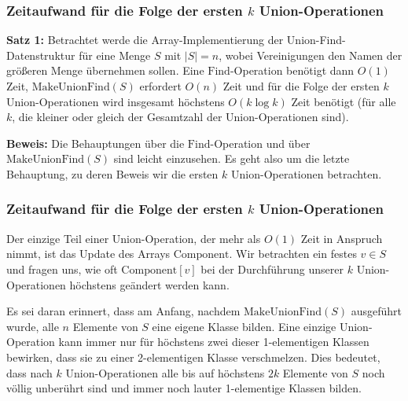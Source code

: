 \documentclass[smaller,xcolor=dvipsnames]{beamer}
\newcommand{\opfind}{\text{Find}}
\newcommand{\opunion}{\text{Union}}
\newcommand{\opmakeunionfind}{\text{MakeUnionFind}}
\newcommand{\component}{\text{Component}}
\begin{document}
\begin{frame}
\frametitle{Zeitaufwand für die Folge der ersten $k$ Union-Operationen}
\textbf{Satz 1:}
Betrachtet werde die \alert{Array-Implementierung der Union-Find-Datenstruktur} für eine Menge $S$ mit $|S|=n$, wobei Vereinigungen den Namen der größeren Menge übernehmen sollen. Eine $\opfind$-Operation benötigt dann $O(1)$ Zeit, $\opmakeunionfind{(S)}$ erfordert $O(n)$ Zeit und für die Folge der ersten $k$ $\opunion$-Operationen wird insgesamt höchstens $O(k \log{k})$ Zeit benötigt (für alle $k$, die kleiner oder gleich der Gesamtzahl der Union-Operationen sind). \\ \medskip

\textbf{Beweis:} Die Behauptungen über die $\opfind$-Operation und über $\opmakeunionfind{(S)}$ sind leicht einzusehen. Es geht also um die letzte Behauptung, zu deren Beweis wir die ersten $k$ $\opunion$-Operationen betrachten. 
\end{frame}

\begin{frame}
\frametitle{Zeitaufwand für die Folge der ersten $k$ Union-Operationen}
Der einzige Teil einer $\opunion$-Operation, der mehr als $O(1)$ Zeit in Anspruch nimmt, ist das Update des Arrays $\component$. \alert{Wir betrachten ein festes $v \in S$ und fragen uns, wie oft $\component[v]$ bei der Durchführung unserer $k$ Union-Operationen höchstens geändert werden kann.} \\ \medskip 

 Es sei daran erinnert, dass am Anfang, nachdem $\opmakeunionfind{(S)}$ ausgeführt wurde, alle $n$ Elemente von $S$ eine eigene Klasse bilden. Eine einzige $\opunion$-Operation kann immer nur für höchstens zwei dieser 1-elementigen Klassen bewirken, dass sie zu einer 2-elementigen Klasse verschmelzen. Dies bedeutet, dass nach $k$ $\opunion$-Operationen alle bis auf höchstens $2k$ Elemente von $S$ noch völlig unberührt sind und immer noch lauter 1-elementige Klassen bilden.
\end{frame}
\end{document}
